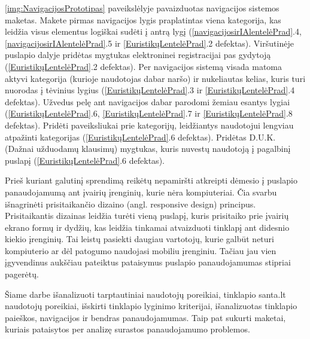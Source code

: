 \documentclass{VUMIFPSkursinis}
\begin{document}
\ref{img:NavigacijosPrototipas} paveikslėlyje pavaizduotas navigacijos sistemos maketas. Makete pirmas navigacijos lygis praplatintas viena kategorija, kas leidžia visus elementus logiškai sudėti į antrą lygį (\ref{navigacijosirIAlentelėPrad}.4, \ref{navigacijosirIAlentelėPrad}.5 ir \ref{EuristikųLentelėPrad}.2 defektas). Viršutinėje puslapio dalyje pridėtas mygtukas elektroninei registracijai pas gydytoją (\ref{EuristikųLentelėPrad}.2 defektas). Per navigacijos sistemą visada matoma aktyvi kategorija (kurioje naudotojas dabar naršo) ir nukeliautas kelias, kuris turi nuorodas į tėvinius lygius (\ref{EuristikųLentelėPrad}.3 ir \ref{EuristikųLentelėPrad}.4 defektas). Užvedus pelę ant navigacijos dabar parodomi žemiau esantys lygiai (\ref{EuristikųLentelėPrad}.6, \ref{EuristikųLentelėPrad}.7 ir \ref{EuristikųLentelėPrad}.8 defektas). Pridėti paveiksliukai prie kategorijų, leidžiantys naudotojui lengviau atpažinti kategorijas (\ref{EuristikųLentelėPrad}.6 defektas). Pridėtas D.U.K. (Dažnai užduodamų klausimų) mygtukas, kuris nuvestų naudotoją į pagalbinį puslapį (\ref{EuristikųLentelėPrad}.6 defektas).

Prieš kuriant galutinį sprendimą reikėtų nepamiršti atkreipti dėmesio į puslapio panaudojamumą ant įvairių įrenginių, kurie nėra kompiuteriai. Čia svarbu išnagrinėti prisitaikančio dizaino (angl. responsive design) principus. Prisitaikantis dizainas leidžia turėti vieną puslapį, kuris prisitaiko prie įvairių ekrano formų ir dydžių\cite{RWDEn}, kas leidžia tinkamai atvaizduoti tinklapį ant didesnio kiekio įrenginių. Tai leistų pasiekti daugiau vartotojų, kurie galbūt neturi kompiuterio ar dėl patogumo naudojasi mobiliu įrenginiu. Tačiau jau vien įgyvendinus aukščiau pateiktus pataisymus puslapio panaudojamumas stipriai pagerėtų.


%



Šiame darbe išanalizuoti tarptautiniai naudotojų poreikiai, tinklapio santa.lt naudotojų poreikiai, išskirti tinklapio lyginimo kriterijai, išanalizuotas tinklapio paieškos, navigacijos ir bendras panaudojamumas. Taip pat sukurti maketai, kuriais pataisytos per analizę surastos panaudojamumo problemos.
\end{document}
